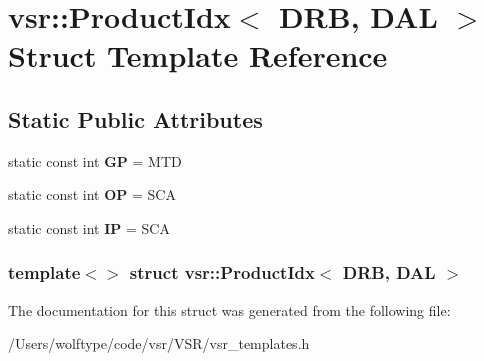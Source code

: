 \hypertarget{structvsr_1_1_product_idx_3_01_d_r_b_00_01_d_a_l_01_4}{\section{vsr\-:\-:Product\-Idx$<$ D\-R\-B, D\-A\-L $>$ Struct Template Reference}
\label{structvsr_1_1_product_idx_3_01_d_r_b_00_01_d_a_l_01_4}
}
\subsection*{Static Public Attributes}
\begin{DoxyCompactItemize}
\item 
\hypertarget{structvsr_1_1_product_idx_3_01_d_r_b_00_01_d_a_l_01_4_a0c60b6d7beaddccc56fdb6668ac69344}{static const int {\bfseries G\-P} = M\-T\-D}\label{structvsr_1_1_product_idx_3_01_d_r_b_00_01_d_a_l_01_4_a0c60b6d7beaddccc56fdb6668ac69344}

\item 
\hypertarget{structvsr_1_1_product_idx_3_01_d_r_b_00_01_d_a_l_01_4_a7530f1f5c26a17b1a9b1bbbf6e1824f4}{static const int {\bfseries O\-P} = S\-C\-A}\label{structvsr_1_1_product_idx_3_01_d_r_b_00_01_d_a_l_01_4_a7530f1f5c26a17b1a9b1bbbf6e1824f4}

\item 
\hypertarget{structvsr_1_1_product_idx_3_01_d_r_b_00_01_d_a_l_01_4_a1b6fffb5c8ce41ef4a40390249572182}{static const int {\bfseries I\-P} = S\-C\-A}\label{structvsr_1_1_product_idx_3_01_d_r_b_00_01_d_a_l_01_4_a1b6fffb5c8ce41ef4a40390249572182}

\end{DoxyCompactItemize}
\subsubsection*{template$<$$>$ struct vsr\-::\-Product\-Idx$<$ D\-R\-B, D\-A\-L $>$}



The documentation for this struct was generated from the following file\-:\begin{DoxyCompactItemize}
\item 
/\-Users/wolftype/code/vsr/\-V\-S\-R/vsr\-\_\-templates.\-h\end{DoxyCompactItemize}
